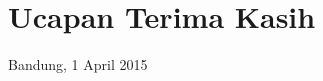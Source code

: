 \chapter*{Ucapan Terima Kasih}

\vspace*{0.1cm}
\begin{flushright}
Bandung, 1 April 2015\\[0.1cm]
\vspace*{1cm}
\penulis

\end{flushright}
